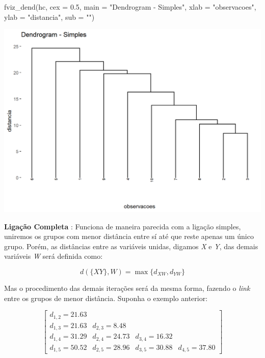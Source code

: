 \documentclass[
  letterpaper,
  DIV=11,
  numbers=noendperiod]{scrreprt}
\newenvironment{Shaded}{\begin{snugshade}}{\end{snugshade}}
\newcommand{\AttributeTok}[1]{\textcolor[rgb]{0.40,0.45,0.13}{#1}}
\newcommand{\FloatTok}[1]{\textcolor[rgb]{0.68,0.00,0.00}{#1}}
\newcommand{\FunctionTok}[1]{\textcolor[rgb]{0.28,0.35,0.67}{#1}}
\newcommand{\NormalTok}[1]{\textcolor[rgb]{0.00,0.23,0.31}{#1}}
\newcommand{\StringTok}[1]{\textcolor[rgb]{0.13,0.47,0.30}{#1}}
\begin{document}
\begin{Shaded}
\begin{Highlighting}[]
\FunctionTok{fviz\_dend}\NormalTok{(hc, }\AttributeTok{cex =} \FloatTok{0.5}\NormalTok{,}
          \AttributeTok{main =} \StringTok{"Dendrogram {-} Simples"}\NormalTok{,}
          \AttributeTok{xlab =} \StringTok{"observacoes"}\NormalTok{, }\AttributeTok{ylab =} \StringTok{"distancia"}\NormalTok{, }\AttributeTok{sub =} \StringTok{""}\NormalTok{)}
\end{Highlighting}
\end{Shaded}

\includegraphics{./figuras_naosupervisionado/unnamed-chunk-7-1.png}

\textbf{Ligação Completa} : Funciona de maneira parecida com a ligação
simples, uniremos os grupos com menor distância entre sí até que reste
apenas um único grupo. Porém, as distâncias entre as variáveis unidas,
digamos \emph{X} e \emph{Y}, das demais variáveis \emph{W} será definida
como:

\[
d(\{XY\},W) = \max\{d_{XW},d_{YW}\}
\]

Mas o procedimento das demais iterações será da mesma forma, fazendo o
\emph{link} entre os grupos de menor distância. Suponha o exemplo
anterior:

\[
\begin{bmatrix}
d_{1,2}=21.63 &  & & \\
d_{1,3}= 21.63 & d_{2,3}=8.48 & & \\
d_{1,4}=31.29 & d_{2,4}=24.73 & d_{3,4}=16.32 \\
d_{1,5}=50.52 & d_{2,5}=28.96 & d_{3,5}=30.88 & d_{4,5}=37.80
\end{bmatrix}
\]
\end{document}
